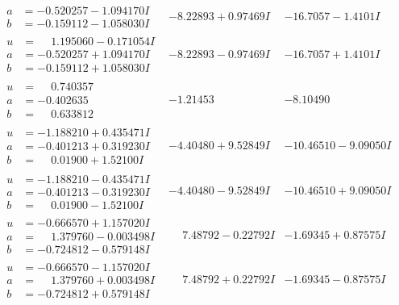 \documentclass[1p]{elsarticle_modified}
\theoremstyle{definition}
\begin{document}
$$\begin{array}{c|c|c}
\begin{aligned}
a &= -0.520257 - 1.094170 I \\
b &= -0.159112 - 1.058030 I\end{aligned}
 & -8.22893 + 0.97469 I & -16.7057 - 1.4101 I \\ \hline\begin{aligned}
u &= \phantom{-}1.195060 - 0.171054 I \\
a &= -0.520257 + 1.094170 I \\
b &= -0.159112 + 1.058030 I\end{aligned}
 & -8.22893 - 0.97469 I & -16.7057 + 1.4101 I \\ \hline\begin{aligned}
u &= \phantom{-}0.740357\phantom{ +0.000000I} \\
a &= -0.402635\phantom{ +0.000000I} \\
b &= \phantom{-}0.633812\phantom{ +0.000000I}\end{aligned}
 & -1.21453\phantom{ +0.000000I} & -8.10490\phantom{ +0.000000I} \\ \hline\begin{aligned}
u &= -1.188210 + 0.435471 I \\
a &= -0.401213 + 0.319230 I \\
b &= \phantom{-}0.01900 + 1.52100 I\end{aligned}
 & -4.40480 + 9.52849 I & -10.46510 - 9.09050 I \\ \hline\begin{aligned}
u &= -1.188210 - 0.435471 I \\
a &= -0.401213 - 0.319230 I \\
b &= \phantom{-}0.01900 - 1.52100 I\end{aligned}
 & -4.40480 - 9.52849 I & -10.46510 + 9.09050 I \\ \hline\begin{aligned}
u &= -0.666570 + 1.157020 I \\
a &= \phantom{-}1.379760 - 0.003498 I \\
b &= -0.724812 - 0.579148 I\end{aligned}
 & \phantom{-}7.48792 - 0.22792 I & -1.69345 + 0.87575 I \\ \hline\begin{aligned}
u &= -0.666570 - 1.157020 I \\
a &= \phantom{-}1.379760 + 0.003498 I \\
b &= -0.724812 + 0.579148 I\end{aligned}
 & \phantom{-}7.48792 + 0.22792 I & -1.69345 - 0.87575 I \\ \hline\begin{aligned}

\end{aligned}
\end{array}$$
\end{document}
